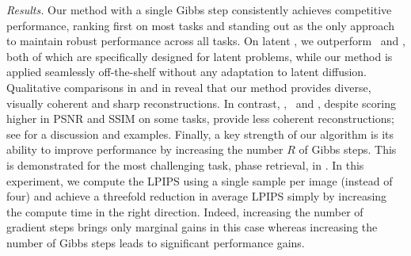 \emph{Results.} Our method with a single Gibbs step consistently achieves competitive performance, ranking first on most tasks and standing out as the only approach to maintain robust performance across all tasks. On latent \ffhq, we outperform \resample\ and \psld, both of which are specifically designed for latent problems, while our method is applied seamlessly off-the-shelf without any adaptation to latent diffusion. Qualitative comparisons in  and in  reveal that our method provides diverse, visually coherent and sharp reconstructions. In contrast, \daps, \ddnm\ and \diffpir, despite scoring higher in PSNR and SSIM on some tasks, provide less coherent reconstructions; see  for a discussion and examples. 
Finally, a key strength of our algorithm is its ability to improve performance by increasing the number  $R$  of Gibbs steps. This is demonstrated for the most challenging task, phase retrieval, in . In this experiment, we compute the LPIPS using a single sample per image (instead of four) and achieve a threefold reduction in average LPIPS simply by increasing the compute time in the right direction. Indeed, increasing the number of gradient steps brings only marginal gains in this case whereas increasing the number of Gibbs steps leads to significant performance gains.
